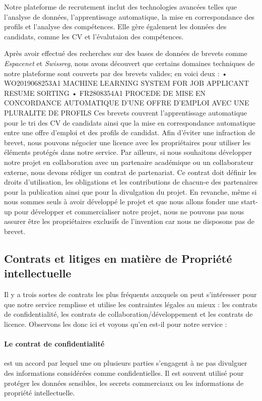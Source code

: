 Notre plateforme de recrutement inclut des technologies avancées telles que l’analyse de données, l’apprentissage automatique,  la mise en correspondance des profils et l’analyse des compétences. Elle gère également les données des candidats, comme les CV et l’évalutaion des compétences.\newline 

Après avoir effectué des recherches sur des bases de données de brevets comme \textit{Espacenet} et \textit{Swissreg}, nous avons découvert que certains domaines techniques de notre plateforme sont couverts par des brevets valides; en voici deux : 
•   WO2019068253A1 MACHINE LEARNING SYSTEM FOR JOB APPLICANT RESUME SORTING
•   FR2808354A1 PROCEDE DE MISE EN CONCORDANCE AUTOMATIQUE D'UNE OFFRE D'EMPLOI AVEC UNE PLURALITE DE PROFILS
Ces brevets couvrent l'apprentissage automatique pour le tri des CV de candidats ainsi que la mise en correspondance automatique entre une offre d'emploi et des profils de candidat.
Afin d’éviter une infraction de brevet, nous pouvons négocier une licence avec les propriétaires pour utiliser les éléments protégés dans notre service. 
Par ailleurs, si nous souhaitons développer notre projet en collaboration avec un partenaire académique ou un collaborateur externe, nous devons rédiger un contrat de partenariat. Ce contrat doit définir les droits d’utilisation, les obligations et les contributions de chacun-e des partenaires pour la publication ainsi que pour la divulgation du projet. 
En revanche, même si nous sommes seuls à avoir développé le projet et que nous allons fonder une start-up pour développer et commercialiser notre projet,  nous ne pouvons pas nous assurer être les propriétaires exclusifs de l'invention car nous ne disposons pas de brevet. 

\subsection{Contrats et litiges en matière de Propriété intellectuelle}

Il y a trois sortes de contrats les plus fréquents auxquels on peut s'intéresser pour que notre service remplisse et utilise les contraintes légales au mieux : les contrats de confidentialité, les contrats de collaboration/développement et les contrats de licence. Observons les donc ici et voyons qu'en est-il pour notre service : 

\paragraph{Le contrat de confidentialité} est un accord par lequel une ou plusieurs parties s'engagent à ne pas divulguer des informations considérées comme confidentielles. Il est souvent utilisé pour protéger les données sensibles, les secrets commerciaux ou les informations de propriété intellectuelle.

